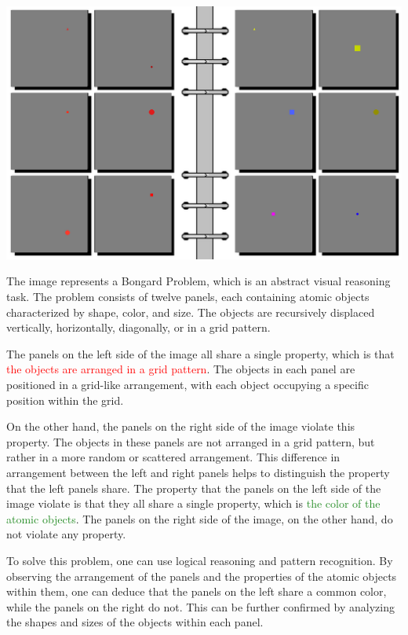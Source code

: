 \begin{tcolorbox}[breakable,enhanced jigsaw,opacityback=0,]
	\centering
	\includegraphics[width=.8\linewidth]{imgs/bongard/easy-3.png}\\
	\begin{dialogue}
		 The image represents a Bongard Problem, which is an abstract visual reasoning task. The problem consists of twelve panels, each containing atomic objects characterized by shape, color, and size. The objects are recursively displaced vertically, horizontally, diagonally, or in a grid pattern.
		
		The panels on the left side of the image all share a single property, which is that \textcolor{red}{the objects are arranged in a grid pattern}. The objects in each panel are positioned in a grid-like arrangement, with each object occupying a specific position within the grid.
		
		On the other hand, the panels on the right side of the image violate this property. The objects in these panels are not arranged in a grid pattern, but rather in a more random or scattered arrangement. This difference in arrangement between the left and right panels helps to distinguish the property that the left panels share.
		\vspace{1em}
		 The property that the panels on the left side of the image violate is that they all share a single property, which is \textcolor{ForestGreen}{the color of the atomic objects}. The panels on the right side of the image, on the other hand, do not violate any property.
		
		To solve this problem, one can use logical reasoning and pattern recognition. By observing the arrangement of the panels and the properties of the atomic objects within them, one can deduce that the panels on the left share a common color, while the panels on the right do not. This can be further confirmed by analyzing the shapes and sizes of the objects within each panel.
		

\end{dialogue}
\end{tcolorbox}
